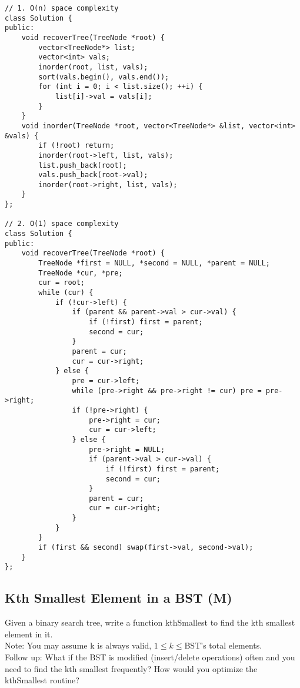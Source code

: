 \begin{lstlisting}
// 1. O(n) space complexity
class Solution {
public:
    void recoverTree(TreeNode *root) {
        vector<TreeNode*> list;
        vector<int> vals;
        inorder(root, list, vals);
        sort(vals.begin(), vals.end());
        for (int i = 0; i < list.size(); ++i) {
            list[i]->val = vals[i];
        }
    }
    void inorder(TreeNode *root, vector<TreeNode*> &list, vector<int> &vals) {
        if (!root) return;
        inorder(root->left, list, vals);
        list.push_back(root);
        vals.push_back(root->val);
        inorder(root->right, list, vals);
    }
};

// 2. O(1) space complexity
class Solution {
public:
    void recoverTree(TreeNode *root) {
        TreeNode *first = NULL, *second = NULL, *parent = NULL;
        TreeNode *cur, *pre;
        cur = root;
        while (cur) {
            if (!cur->left) {
                if (parent && parent->val > cur->val) {
                    if (!first) first = parent;
                    second = cur;
                }
                parent = cur;
                cur = cur->right;
            } else {
                pre = cur->left;
                while (pre->right && pre->right != cur) pre = pre->right;
                if (!pre->right) {
                    pre->right = cur;
                    cur = cur->left;
                } else {
                    pre->right = NULL;
                    if (parent->val > cur->val) {
                        if (!first) first = parent;
                        second = cur;
                    }
                    parent = cur;
                    cur = cur->right;
                }
            }
        }
        if (first && second) swap(first->val, second->val);
    }
};
\end{lstlisting}


\subsection{Kth Smallest Element in a BST (M)}
Given a binary search tree, write a function kthSmallest to find the kth smallest element in it.\\

Note:
You may assume k is always valid, $1 \leq k \leq $BST's total elements.\\

Follow up:
What if the BST is modified (insert/delete operations) often and you need to find the kth smallest frequently? How would you optimize the kthSmallest routine?\\


